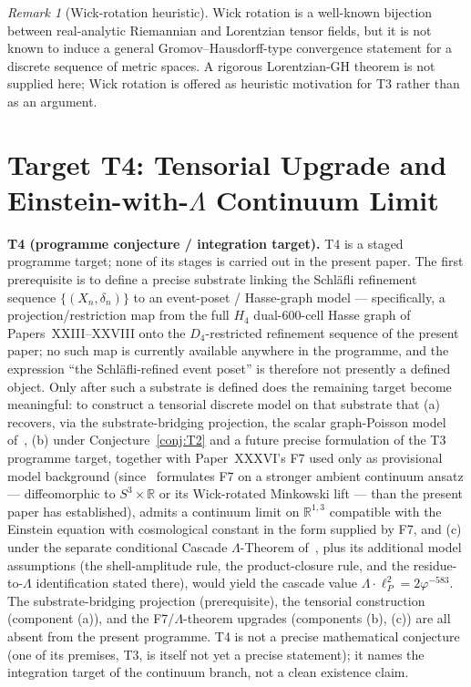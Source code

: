 \documentclass[12pt]{article}
\theoremstyle{definition}
\theoremstyle{remark}
\newtheorem{remark}[theorem]{Remark}
\begin{document}
\begin{remark}[Wick-rotation heuristic]
Wick rotation is a well-known bijection between real-analytic Riemannian and Lorentzian tensor fields, but it is not known to induce a general Gromov--Hausdorff-type convergence statement for a discrete sequence of metric spaces. A rigorous Lorentzian-GH theorem is not supplied here; Wick rotation is offered as heuristic motivation for T3 rather than as an argument.
\end{remark}

\section{Target T4: Tensorial Upgrade and Einstein-with-$\Lambda$ Continuum Limit}\label{sec:T4}

\textbf{T4 (programme conjecture \label{target:T4} / integration target).} T4 is a staged programme target; none of its stages is carried out in the present paper. The first prerequisite is to define a precise substrate linking the Schl\"afli refinement sequence $\{(X_n, \delta_n)\}$ to an event-poset / Hasse-graph model --- specifically, a projection/restriction map from the full $H_4$ dual-600-cell Hasse graph of Papers~XXIII--XXVIII onto the $D_4$-restricted refinement sequence of the present paper; no such map is currently available anywhere in the programme, and the expression ``the Schl\"afli-refined event poset'' is therefore not presently a defined object. Only after such a substrate is defined does the remaining target become meaningful: to construct a tensorial discrete model on that substrate that (a) recovers, via the substrate-bridging projection, the scalar graph-Poisson model of~\citep{SmartXXVII}, (b) under Conjecture~\ref{conj:T2} and a future precise formulation of the T3 programme target, together with Paper~XXXVI's F7 used only as provisional model background (since~\citep{SmartXXXVI} formulates F7 on a stronger ambient continuum ansatz --- diffeomorphic to $S^3 \times \mathbb{R}$ or its Wick-rotated Minkowski lift --- than the present paper has established), admits a continuum limit on $\mathbb{R}^{1,3}$ compatible with the Einstein equation with cosmological constant in the form supplied by F7, and (c) under the separate conditional Cascade $\Lambda$-Theorem of~\citep{SmartXXXVI}, plus its additional model assumptions (the shell-amplitude rule, the product-closure rule, and the residue-to-$\Lambda$ identification stated there), would yield the cascade value $\Lambda \cdot \ell_P^2 = 2 \varphi^{-583}$. The substrate-bridging projection (prerequisite), the tensorial construction (component (a)), and the F7/$\Lambda$-theorem upgrades (components (b), (c)) are all absent from the present programme. T4 is not a precise mathematical conjecture (one of its premises, T3, is itself not yet a precise statement); it names the integration target of the continuum branch, not a clean existence claim.
\end{document}
